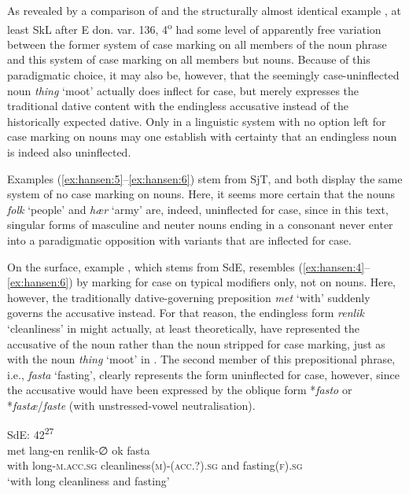 \documentclass[output=paper]{langsci/langscibook}
\begin{document}
As revealed by a comparison of  and the structurally almost identical example , at least SkL after E don. var. 136, 4\textsuperscript{o} had some level of apparently free variation between the former system of case marking on all members of the noun phrase and this system of case marking on all members but nouns. Because of this paradigmatic choice, it may also be, however, that the seemingly case-uninflected noun \textit{thing} ‘moot’ actually does inflect for case, but merely expresses the traditional dative content with the endingless accusative instead of the historically expected dative. Only in a linguistic system with no option left for case marking on nouns may one establish with certainty that an endingless noun is indeed also uninflected.

Examples (\ref{ex:hansen:5}--\ref{ex:hansen:6}) stem from SjT, and both display the same system of no case marking on nouns. Here, it seems more certain that the nouns \textit{folk} ‘people’ and \textit{hær} ‘army’ are, indeed, uninflected for case, since in this text, singular forms of masculine and neuter nouns ending in a consonant never enter into a paradigmatic opposition with variants that are inflected for case.

On the surface, example , which stems from SdE, resembles (\ref{ex:hansen:4}--\ref{ex:hansen:6}) by marking for case on typical modifiers only, not on nouns. Here, however, the traditionally dative-governing preposition \textit{met} ‘with’ suddenly governs the accusative instead. For that reason, the endingless form \textit{renlik} ‘cleanliness’ in  might actually, at least theoretically, have represented the accusative of the noun rather than the noun stripped for case marking, just as with the noun \textit{thing} ‘moot’ in . The second member of this prepositional phrase, i.e., \textit{fasta} ‘fasting’, clearly represents the form uninflected for case, however, since the accusative would have been expressed by the oblique form *\textit{fasto} or *\textit{fastæ}/\textit{faste} (with unstressed-vowel neutralisation).

\ea \label{ex:hansen:7}
{SdE: 42\textsuperscript{27}} \\ 
\gll met lang-en renlik-∅ ok fasta\\
     with long\textsc{{}-}\textsc{m.acc.sg} cleanliness\textsc{(m)-(acc.?).sg} and fasting\textsc{(f).sg}\\
\glt ‘with long cleanliness and fasting’
\z
\end{document}
